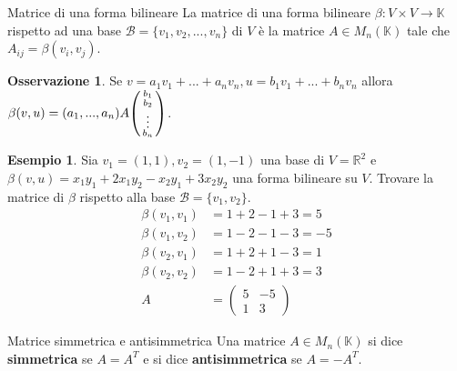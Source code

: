 \documentclass[a4paper]{article}
\theoremstyle{definition}
\newtheorem*{oss}{Osservazione}
\newtheorem*{es}{Esempio}
\begin{document}
	\begin{deff}{Matrice di una forma bilineare}{}
		La matrice di una forma bilineare $\beta: V \times V \to \mathbb{K}$ rispetto ad una base $\mathcal{B} = \{v_1, v_2, ..., v_n\}$ di $V$
		è la matrice $A \in M_n(\mathbb{K})$ tale che $A_{ij} = \beta(v_i, v_j)$.
	\end{deff}
	\begin{oss}
		Se $v = a_1v_1 + ... + a_nv_n, u = b_1v_1 + ... + b_nv_n$ allora $\beta(v, u) = (a_1, ..., a_n)A \begin{psmallmatrix}
			b_1 \\
			b_2 \\
			\vdots \\
			b_n
		\end{psmallmatrix}$.
	\end{oss}

	\begin{es}
		Sia $v_1 = (1, 1), v_2 = (1, -1)$ una base di $V = \mathbb{R}^2$ e $\beta(v, u) = x_1y_1 + 2x_1y_2 - x_2y_1 + 3x_2y_2$ una forma bilineare su $V$.
		Trovare la matrice di $\beta$ rispetto alla base $\mathcal{B} = \{v_1, v_2\}$.
		\begin{align*}
			\beta(v_1, v_1) &= 1 + 2 - 1 + 3 = 5 \\
			\beta(v_1, v_2) &= 1 - 2 - 1 - 3 = - 5 \\
			\beta(v_2, v_1) &= 1 + 2 + 1 - 3 = 1 \\
			\beta(v_2, v_2) &= 1 - 2 + 1 + 3 = 3 \\
			A &= \begin{pmatrix}
				5 & -5 \\
				1 & 3
			\end{pmatrix}
		\end{align*}
	\end{es}

	\begin{deff}{Matrice simmetrica e antisimmetrica}{}
		Una matrice $A \in M_n(\mathbb{K})$ si dice \textbf{simmetrica} se $A = A^T$ e si dice \textbf{antisimmetrica} se $A = -A^T$.
	\end{deff}
\end{document}
